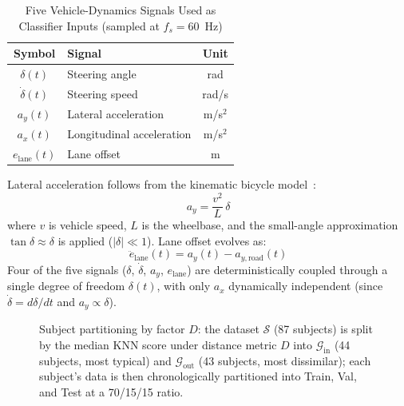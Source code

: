 \documentclass[lettersize,journal]{IEEEtran}
\begin{document}
\begin{table}[!t]
\caption{Five Vehicle-Dynamics Signals Used as Classifier Inputs (sampled at $f_s = 60$~Hz)\label{tab:signals}}
\centering
\begin{tabular}{|c|l|c|}
\hline
Symbol & Signal & Unit \\
\hline
$\delta(t)$ & Steering angle & rad \\
\hline
$\dot{\delta}(t)$ & Steering speed & rad/s \\
\hline
$a_y(t)$ & Lateral acceleration & m/s$^2$ \\
\hline
$a_x(t)$ & Longitudinal acceleration & m/s$^2$ \\
\hline
$e_{\text{lane}}(t)$ & Lane offset & m \\
\hline
\end{tabular}
\end{table}

Lateral acceleration follows from the kinematic bicycle model~\cite{rajamani2012}:
\begin{equation}
\label{eq:bicycle}
a_y = \frac{v^2}{L}\,\delta
\end{equation}
where $v$ is vehicle speed, $L$ is the wheelbase, and the small-angle approximation $\tan\delta \approx \delta$ is applied ($|\delta| \ll 1$).
Lane offset evolves as:
\begin{equation}
\label{eq:lane_offset}
\ddot{e}_{\text{lane}}(t) = a_y(t) - a_{y,\text{road}}(t)
\end{equation}
Four of the five signals ($\delta$, $\dot{\delta}$, $a_y$, $e_{\text{lane}}$) are deterministically coupled through a single degree of freedom $\delta(t)$, with only $a_x$ dynamically independent (since $\dot{\delta} = d\delta/dt$ and $a_y \propto \delta$).

\begin{figure}[!t]
\centering
\resizebox{\columnwidth}{!}{}
\caption{Subject partitioning by factor $D$: the dataset $\mathcal{S}$ (87 subjects) is split by the median KNN score under distance metric $D$ into $\mathcal{G}_{\mathrm{in}}$ (44 subjects, most typical) and $\mathcal{G}_{\mathrm{out}}$ (43 subjects, most dissimilar); each subject's data is then chronologically partitioned into Train, Val, and Test at a 70/15/15 ratio.}
\label{fig:framework_partition}
\end{figure}
\end{document}
